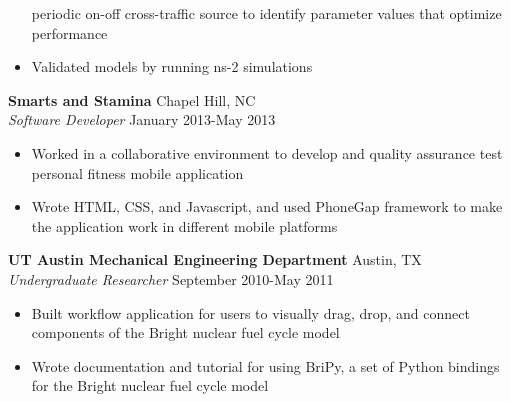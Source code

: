 \documentclass[line,margin,letterpaper]{res}
\begin{document}
\begin{resume}
\begin{itemize}
    periodic on-off cross-traffic source to identify parameter values that 
    optimize performance
    \item Validated models by running ns-2 simulations
  \end{itemize}
  {\bf Smarts and Stamina} \hfill Chapel Hill, NC \\
  \emph{Software Developer} \hfill January 2013-May 2013
  \begin{itemize} \itemsep -2pt
    \item Worked in a collaborative environment to develop and quality 
    assurance test personal fitness mobile application
    \item Wrote HTML, CSS, and Javascript, and used PhoneGap framework to make 
    the application work in different mobile platforms
  \end{itemize}
  {\bf UT Austin Mechanical Engineering Department} \hfill Austin, TX \\
  \emph{Undergraduate Researcher} \hfill September 2010-May 2011
  \begin{itemize} \itemsep -2pt
    \item Built workflow application for users to visually drag, drop, and 
    connect components of the Bright nuclear fuel cycle model
    \item Wrote documentation and tutorial for using BriPy, a set of Python
    bindings for the Bright nuclear fuel cycle model
  \end{itemize}

\end{resume}
\end{document}

